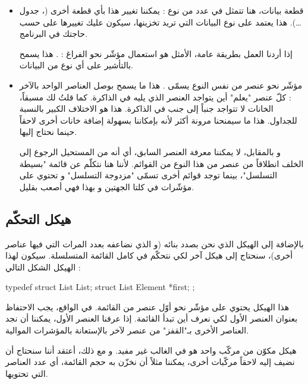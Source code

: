 \begin{itemize}
	\item قطعة بيانات، هنا تتمثل في عدد من نوع 
	 :
	يمكننا تغيير هذا بأي قطعة أخرى
	(،
	جدول \dots). هذا يعتمد على نوع البيانات التي تريد تخزينها، سيكون عليك تغييرها على حسب حاجتك في البرنامج.
	
	\begin{information}
		إذا أردنا العمل بطريقة عامة، الأمثل هو استعمال مؤشّر نحو الفراغ :
		.
		هذا يسمح بالتأشير على أي نوع من البيانات.
	\end{information}
	\item مؤشّر نحو عنصر من نفس النوع يسمّى
	\InlineCode{next}.
	هذا ما يسمح بوصل العناصر الواحد بالآخر : كلّ عنصر "يعلم" أين يتواجد العنصر الذي يليه في الذاكرة. كما قلتُ لك مسبقاً، الخانات لا تتواجد جنباً إلى جنب في الذاكرة. هذا هو الاختلاف الكبير بالنسبة للجداول. هذا ما سيمنحنا مرونة أكثر لأنه بإمكاننا بسهولة إضافة خانات أخرى لاحقاً حينما نحتاج إليها.

\begin{information}
	و بالمقابل، لا يمكننا معرفة العنصر السابق، أي أنه من المستحيل الرجوع إلى الخلف انطلاقاً من عنصر من هذا النوع من القوائم. لأننا هنا نتكلّم عن قائمة "بسيطة التسلسل"، بينما توجد قوائم أخرى تسمّى "مزدوجة التسلسل" و تحتوي على مؤشّرات في كلتا الجهتين و بهذا فهي أصعب بقليل.
\end{information}
\end{itemize}


\subsection{هيكل التحكّم}

بالإضافة إلى الهيكل الذي نحن بصدد بنائه (و الذي نضاعفه بعدد المرات التي فيها عناصر أخرى)، سنحتاج إلى هيكل آخر لكي نتحكّم في كامل القائمة المتسلسلة. سيكون لهذا الهيكل الشكل التالي :

\begin{Csource}
typedef struct List List;
struct List
{
	Element *first;
};
\end{Csource}

هذا الهيكل
يحتوي على مؤشّر نحو أوّل عنصر من القائمة. في الواقع، يجب الاحتفاظ بعنوان العنصر الأول لكي نعرف أين تبدأ القائمة. إذا عرفنا العنصر الأول، يمكننا أن نجد العناصر الأخرى بـ"القفز" من عنصر لآخر بالإستعانة بالمؤشرات الموالية.

\begin{information}
هيكل مكوّن من مركّب واحد هو في الغالب غير مفيد. و مع ذلك، أعتقد أننا سنحتاج أن نضيف إليه لاحقاً مركّبات أخرى، يمكننا مثلاً أن نخزّن به حجم القائمة، أي عدد العناصر التي تحتويها.
\end{information}

